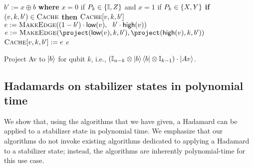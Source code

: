 \begin{algorithm}
    \begin{algorithmic}[1]
        \State $b' :=  x \oplus b $ \textbf{where} $x=0$ if $P_k\in\set{\mathbb I,Z}$ and $x=1$ if $P_k\in\set{X,Y}$
        \label{l:project-diag2}           
        \State \textbf{if} $(v,k, b') \in \cache$ \textbf{then} \Return $\cache[v,k, b']$
                \State $e := \makeedge((1- b') \cdot \low v,~~ b' \cdot \high v)$ 
                     \label{l:project-project}
            \Else {}
                \State $e :=\textsc{MakeEdge}(\project(\low v,k, b'),
                                            \project(\high v,k,b'))$ \label{l:project-bt}\vspace{-1em}
             \EndIf
                 \State $\cache[v,k, b'] := e$
                 \State \Return $e$
                \EndProcedure
        \end{algorithmic}
        \caption{Project \limdd \ledge Av to $\ket b$ for qubit $k$, i.e.,
           $(\id[n-k] \otimes \ket{b}\bra{b}\otimes \id[k-1])\cdot \ket{Av}$.}
        \label{alg:measure-arbitrary-qubit-update2}
\end{algorithm}

\subsection{Hadamards on stabilizer states in polynomial time}
\label{sec:hadamard-stabilizer-polytime}

We show that, using the algorithms that we have given, a Hadamard can be applied to a stabilizer state in polynomial time.
We emphasize that our algorithms do not invoke existing algorithms dedicated to applying a Hadamard to a stabilizer state; instead, the \limdd algorithms are inherently polynomial-time for this use case.

